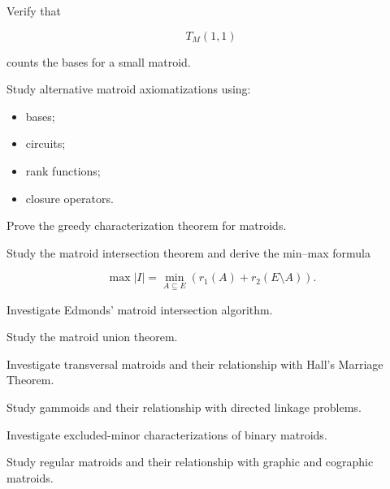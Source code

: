 \begin{exercise}[3]
Verify that

\[
T_M(1,1)
\]

counts the bases for a small matroid.
\end{exercise}

\begin{exercise}[4]
Study alternative matroid axiomatizations using:
\begin{itemize}
    \item bases;
    \item circuits;
    \item rank functions;
    \item closure operators.
\end{itemize}
\end{exercise}

\begin{exercise}[4]
Prove the greedy characterization theorem for matroids.
\end{exercise}

\begin{exercise}[4]
Study the matroid intersection theorem and derive the min--max formula

\[
\max |I|
=
\min_{A\subseteq E}
\left(
r_1(A)+r_2(E\setminus A)
\right).
\]
\end{exercise}

\begin{exercise}[4]
Investigate Edmonds' matroid intersection algorithm.
\end{exercise}

\begin{exercise}[4]
Study the matroid union theorem.
\end{exercise}

\begin{exercise}[4]
Investigate transversal matroids and their relationship with Hall's
Marriage Theorem.
\end{exercise}

\begin{exercise}[4]
Study gammoids and their relationship with directed linkage problems.
\end{exercise}

\begin{exercise}[4]
Investigate excluded-minor characterizations of binary matroids.
\end{exercise}

\begin{exercise}[4]
Study regular matroids and their relationship with graphic and cographic
matroids.
\end{exercise}

